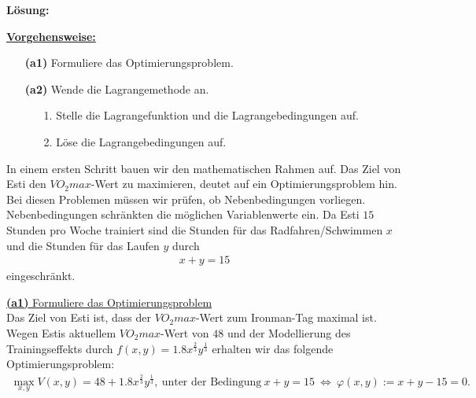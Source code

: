 \textbf{Lösung:}
\begin{mdframed}
\underline{\textbf{Vorgehensweise:}}
\renewcommand{\labelenumi}{\theenumi.}
\begin{enumerate}
\item[\textbf{(a1)}] Formuliere das Optimierungsproblem.
\item[\textbf{(a2)}] Wende die Lagrangemethode an.
\begin{enumerate}
	\item[1.] Stelle die Lagrangefunktion und die Lagrangebedingungen auf. 
	\item[2.] Löse die Lagrangebedingungen auf.
\end{enumerate}
\end{enumerate}
\end{mdframed}
In einem ersten Schritt bauen wir den mathematischen Rahmen auf.
Das Ziel von Esti den $VO_2max$-Wert zu maximieren, deutet auf ein Optimierungsproblem hin. Bei diesen Problemen müssen wir prüfen, ob Nebenbedingungen vorliegen. Nebenbedingungen schränkten die möglichen Variablenwerte ein.
Da Esti $15$ Stunden pro Woche trainiert sind die Stunden für das Radfahren/Schwimmen $x$ und die Stunden für das Laufen $y$ durch
\begin{align*}
	x + y = 15
\end{align*} 
eingeschränkt.
\newpage

\underline{\textbf{(a1)} Formuliere das Optimierungsproblem }\\
Das Ziel von Esti ist, dass der $VO_2max$-Wert zum Ironman-Tag maximal ist.
Wegen Estis aktuellem $VO_2max$-Wert von $48$ und der Modellierung des Trainingseffekts durch $f(x,y) = 1.8 x^{\frac{2}{3}} y^{\frac{1}{3}}$ erhalten wir das folgende Optimierungsproblem:
\begin{align*}
	\max_{x,y} V(x,y)
	=
	48 + 1.8 x^{\frac{2}{3}} y^{\frac{1}{3}},
	\ \text{unter der Bedingung} \ x + y = 15 \ \Leftrightarrow \ \varphi(x,y) := x + y - 15 = 0.
\end{align*}

